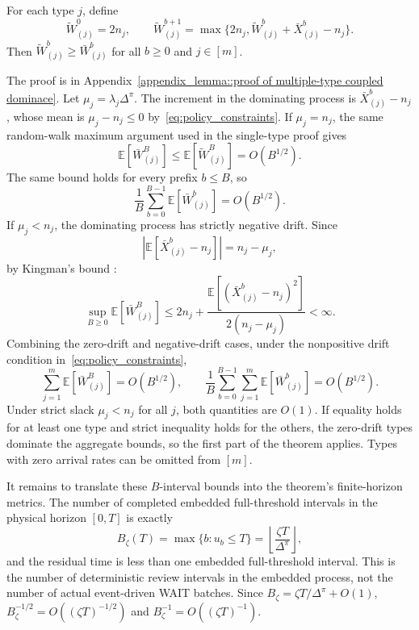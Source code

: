 \begin{lemma}\label{lemma::multiple-type coupled dominace}
For each type \(j\), define
\[
\widetilde W_{(j)}^0=2n_j,\qquad
\widetilde W_{(j)}^{b+1}
=\max\{2n_j,\widetilde W_{(j)}^b+\bar X^b_{(j)}-n_j\}.
\]
Then \(\widetilde W^b_{(j)}\ge \bar W^b_{(j)}\) for all \(b\ge0\) and \(j\in[m]\).
\end{lemma}
\noindent The proof is in Appendix~\ref{appendix_lemma::proof of multiple-type coupled dominace}. Let \(\mu_j=\lambda_j\Delta^\pi\). The increment in the dominating process is \(\bar X^b_{(j)}-n_j\), whose mean is \(\mu_j-n_j\le0\) by~\eqref{eq:policy_constraints}. If \(\mu_j=n_j\), the same random-walk maximum argument used in the single-type proof gives
\[
    \mathbb{E}[\bar W^B_{(j)}]
    \le \mathbb{E}[\widetilde W^B_{(j)}]
    =O(B^{1/2}).
\]
The same bound holds for every prefix \(b\le B\), so
\[
    \frac{1}{B}\sum_{b=0}^{B-1}\mathbb{E}[\bar W^b_{(j)}]=O(B^{1/2}).
\]
If \(\mu_j<n_j\), the dominating process has strictly negative drift. Since
\[
\left|\mathbb{E}[\bar X^b_{(j)}-n_j]\right|=n_j-\mu_j,
\]
by Kingman's bound \citep{kingman1962queues}:
\[
    \sup_{B\ge0}\mathbb{E}[\bar W^B_{(j)}]
    \le
    2n_j+
    \frac{\mathbb{E}[(\bar X^b_{(j)}-n_j)^2]}{2(n_j-\mu_j)}
    <\infty .
\]
Combining the zero-drift and negative-drift cases, under the nonpositive drift condition in~\eqref{eq:policy_constraints},
\[
    \sum_{j=1}^m \mathbb{E}[\bar W^B_{(j)}]=O(B^{1/2}),
    \qquad
    \frac{1}{B}\sum_{b=0}^{B-1}\sum_{j=1}^m \mathbb{E}[\bar W^b_{(j)}]=O(B^{1/2}).
\]
Under strict slack \(\mu_j<n_j\) for all \(j\), both quantities are \(O(1)\). If equality holds for at least one type and strict inequality holds for the others, the zero-drift types dominate the aggregate bounds, so the first part of the theorem applies. Types with zero arrival rates can be omitted from \([m]\).

It remains to translate these \(B\)-interval bounds into the theorem's finite-horizon metrics. The number of completed embedded full-threshold intervals in the physical horizon \([0,T]\) is exactly
\[
    B_\zeta(T)=\max\{b:u_b\le T\}
    =\left\lfloor\frac{\zeta T}{\Delta^\pi}\right\rfloor,
\]
and the residual time is less than one embedded full-threshold interval. This is the number of deterministic review intervals in the embedded process, not the number of actual event-driven WAIT batches. Since \(B_\zeta=\zeta T/\Delta^\pi+O(1)\), \(B_\zeta^{-1/2}=O((\zeta T)^{-1/2})\) and \(B_\zeta^{-1}=O((\zeta T)^{-1})\).

